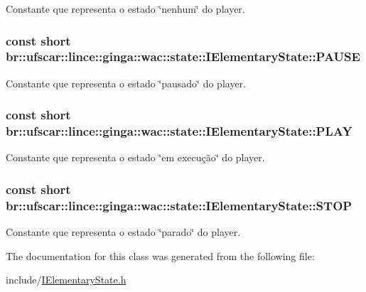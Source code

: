 Constante que representa o estado \char`\"{}nenhum\char`\"{} do player. 

\hypertarget{classbr_1_1ufscar_1_1lince_1_1ginga_1_1wac_1_1state_1_1IElementaryState_a66848654431dc226cdd3349f0aa845f1}{
\subsubsection[{PAUSE}]{\setlength{\rightskip}{0pt plus 5cm}const short {\bf br::ufscar::lince::ginga::wac::state::IElementaryState::PAUSE}}}
\label{classbr_1_1ufscar_1_1lince_1_1ginga_1_1wac_1_1state_1_1IElementaryState_a66848654431dc226cdd3349f0aa845f1}


Constante que representa o estado \char`\"{}pausado\char`\"{} do player. 

\hypertarget{classbr_1_1ufscar_1_1lince_1_1ginga_1_1wac_1_1state_1_1IElementaryState_a2d598e7badbbbb5460ed5e8204bb878f}{
\subsubsection[{PLAY}]{\setlength{\rightskip}{0pt plus 5cm}const short {\bf br::ufscar::lince::ginga::wac::state::IElementaryState::PLAY}}}
\label{classbr_1_1ufscar_1_1lince_1_1ginga_1_1wac_1_1state_1_1IElementaryState_a2d598e7badbbbb5460ed5e8204bb878f}


Constante que representa o estado \char`\"{}em execução\char`\"{} do player. 

\hypertarget{classbr_1_1ufscar_1_1lince_1_1ginga_1_1wac_1_1state_1_1IElementaryState_af53fab5b92d73acc4fb6541d2906d6ce}{
\subsubsection[{STOP}]{\setlength{\rightskip}{0pt plus 5cm}const short {\bf br::ufscar::lince::ginga::wac::state::IElementaryState::STOP}}}
\label{classbr_1_1ufscar_1_1lince_1_1ginga_1_1wac_1_1state_1_1IElementaryState_af53fab5b92d73acc4fb6541d2906d6ce}


Constante que representa o estado \char`\"{}parado\char`\"{} do player. 



The documentation for this class was generated from the following file:\begin{DoxyCompactItemize}
\item 
include/\hyperlink{IElementaryState_8h}{IElementaryState.h}\end{DoxyCompactItemize}
